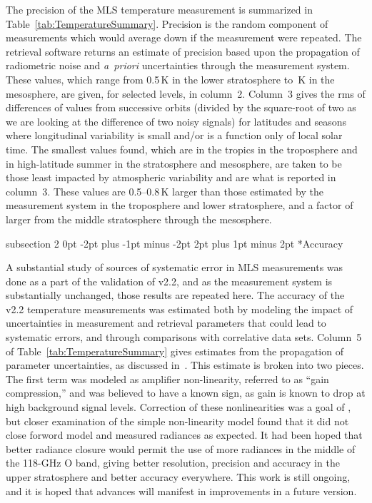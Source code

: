 \documentclass[11pt,draft]{report}
\makeatletter
\renewcommand{\subsection}{\@startsection%
  {subsection}%
  {2}%
  {0pt}%
  {-2pt plus -1pt minus -2pt}%
  {2pt plus 1pt minus 2pt}%
  {\large\sffamily\fontseries{sb}\selectfont\flushleft\color{SectionColor}\figureversion{tabular}}}%
\makeatother
\begin{document}
The precision of the MLS \thisv temperature measurement is summarized in
Table~\ref{tab:TemperatureSummary}.  Precision is the random component
of measurements which would average down if the measurement were
repeated.  The retrieval software returns an estimate of precision based
upon the propagation of radiometric noise and \emph{a~priori}
uncertainties through the measurement system.  These values, which range
from 0.5\,K in the lower stratosphere to \,K in the
mesosphere, are given, for selected levels, in column~2.  Column~3 gives
the rms of differences of values from successive orbits (divided by the
square-root of two as we are looking at the difference of two noisy
signals) for latitudes and seasons where longitudinal variability is
small and/or is a function only of local solar time.  The smallest
values found, which are in the tropics in the troposphere and in 
high-latitude summer in the stratosphere and mesosphere, are taken to be those
least impacted by atmospheric variability and are what is reported in
column~3.  These values are 0.5--0.8\,K larger than those estimated by the
measurement system in the troposphere and lower stratosphere, and a
factor of  larger from the middle stratosphere through
the mesosphere.

\subsection*{Accuracy}

A substantial study of sources of systematic error in MLS measurements
was done as a part of the validation of v2.2, and as the measurement
system is substantially unchanged, those results are repeated here.  The
accuracy of the v2.2 temperature measurements was estimated both by
modeling the impact of uncertainties in measurement and retrieval
parameters that could lead to systematic errors, and through comparisons
with correlative data sets.  Column~5 of
Table~\ref{tab:TemperatureSummary} gives estimates from the propagation
of parameter uncertainties, as discussed in~\citet{SchwartzEtal08}.
This estimate is broken into two pieces.  The first term was modeled as
amplifier non-linearity, referred to as ``gain compression,'' and was
believed to have a known sign, as gain is known to drop at high
background signal levels. Correction of these nonlinearities was a goal
of \thisv, but closer examination of the simple non-linearity model
found that it did not close forword model and measured radiances as
expected.  It had been hoped that better radiance closure would permit
the use of more radiances in the middle of the 118-GHz O band,
giving better resolution, precision and accuracy in the upper
stratosphere and better accuracy everywhere.  This work is still
ongoing, and it is hoped that advances will manifest in improvements in
a future version.
\end{document}
